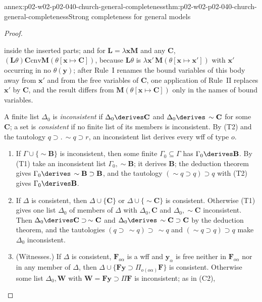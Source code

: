 \begin{annexitem}{annex:p02-w02-p02-040-church-general-completeness}{thm:p02-w02-p02-040-church-general-completeness}{Strong completeness for general models}
\begin{proof}
\begin{enumerate}
   inside the inserted parts; and for \(\mathbf L=\lambda\mathbf x\mathbf M\) and any
   \(\mathbf C\), \((\mathbf L\theta)\mathbf C\mathrel{\mathrm{cnv}}\mathbf M(\theta[\mathbf x\mapsto\mathbf C])\),
   because \(\mathbf L\theta\) is \(\lambda\mathbf x'\,\mathbf M(\theta[\mathbf x\mapsto\mathbf x'])\)
   with \(\mathbf x'\) occurring in no \(\theta(\mathbf y)\); after Rule~I renames
   the bound variables of this body away from \(\mathbf x'\) and from the free
   variables of \(\mathbf C\), one application of Rule~II replaces \(\mathbf x'\)
   by \(\mathbf C\), and the result differs from
   \(\mathbf M(\theta[\mathbf x\mapsto\mathbf C])\) only in the names of bound
   variables.
\end{enumerate}
A finite list \(\Delta_0\) is \emph{inconsistent} if \(\Delta_0\derives\mathbf C\)
and \(\Delta_0\derives\,\sim\mathbf C\) for some \(\mathbf C\); a set is
\emph{consistent} if no finite list of its members is inconsistent.  By (T2)
and the tautology \(q\supset.\,\sim q\supset r\), an inconsistent list derives
every wff of type \(o\).
\begin{enumerate}
 \item[(C1)] If \(\Gamma\cup\{\sim\mathbf B\}\) is inconsistent, then some finite
   \(\Gamma_0\subseteq\Gamma\) has \(\Gamma_0\derives\mathbf B\).  By (T1) take an
   inconsistent list \(\Gamma_0,\sim\mathbf B\); it derives \(\mathbf B\); the
   deduction theorem gives \(\Gamma_0\derives\,\sim\mathbf B\supset\mathbf B\), and
   the tautology \((\sim q\supset q)\supset q\) with (T2) gives
   \(\Gamma_0\derives\mathbf B\).
 \item[(C2)] If \(\Delta\) is consistent, then \(\Delta\cup\{\mathbf C\}\) or
   \(\Delta\cup\{\sim\mathbf C\}\) is consistent.  Otherwise (T1) gives one list
   \(\Delta_0\) of members of \(\Delta\) with \(\Delta_0,\mathbf C\) and
   \(\Delta_0,\sim\mathbf C\) inconsistent.  Then
   \(\Delta_0\derives\mathbf C\supset\,\sim\mathbf C\) and
   \(\Delta_0\derives\,\sim\mathbf C\supset\mathbf C\) by the deduction theorem,
   and the tautologies \((q\supset\,\sim q)\supset\,\sim q\) and
   \((\sim q\supset q)\supset q\) make \(\Delta_0\) inconsistent.
 \item[(C3)] (Witnesses.)  If \(\Delta\) is consistent, \(\mathbf F_{o\alpha}\) is a
   wff and \(\mathbf y_\alpha\) is free neither in \(\mathbf F_{o\alpha}\) nor in any
   member of \(\Delta\), then \(\Delta\cup\{\mathbf F\mathbf y\supset\Pi_{o(o\alpha)}\mathbf F\}\)
   is consistent.  Otherwise some list \(\Delta_0,\mathbf W\) with
   \(\mathbf W=\mathbf F\mathbf y\supset\Pi\mathbf F\) is inconsistent; as in (C2),

\end{enumerate}
\end{proof}
\end{annexitem}
